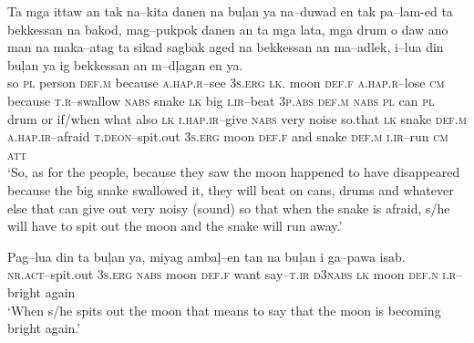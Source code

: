 \ea
\gll Ta  mga  ittaw  an  tak  na--kita  danen  na  bu\c{l}an   ya  na--duwad en  tak  pa--lam-ed  ta  bekkessan   na  bakod,  mag--pukpok  danen  an  ta  mga  lata,  mga  drum   o  daw  ano\footnotemark{}  man  na  maka--atag  ta  sikad  sagbak   aged  na  bekkessan  an  ma--adlek,  i--lua  din  bu\c{l}an   ya  ig\footnotemark{}  bekkessan  an  m--d\c{l}agan  en  ya.\footnotemark{} \\
so  \textsc{pl}  person  \textsc{def.m}  because  \textsc{a.hap.r}--see  3\textsc{s.erg}  \textsc{lk}.  moon
\textsc{def.f}  \textsc{a.hap.r}--lose  \textsc{cm}  because  \textsc{t.r}--swallow  \textsc{nabs}  snake
\textsc{lk}  big  \textsc{i.ir}--beat  3\textsc{p.abs}  \textsc{def.m}  \textsc{nabs}  \textsc{pl}  can  \textsc{pl}  drum
or  if/when  what  also  \textsc{lk}  \textsc{i.hap.ir}--give  \textsc{nabs}  very  noise
so.that  \textsc{lk}  snake  \textsc{def.m}  \textsc{a.hap.ir}--afraid  \textsc{t.deon}--spit.out  3\textsc{s.erg}  moon
\textsc{def.f}  and  snake  \textsc{def.m}  \textsc{i.ir}--run  \textsc{cm}  \textsc{att} \\
\glt ‘So, as for the people, because they saw the moon happened to have disappeared because the big snake swallowed it, they will beat on cans, drums and whatever else that can give out very noisy (sound) so that when the snake is afraid, s/he will have to spit out the moon and the snake will run away.’
\z

\ea
\gll Pag--lua  din  ta  bu\c{l}an  ya,  miyag  amba\c{l}--en   tan  na  bu\c{l}an  i  ga--pawa  isab. \\
\textsc{nr.act}--spit.out  3\textsc{s.erg}  \textsc{nabs}  moon  \textsc{def.f}  want  say--\textsc{t.ir}
\textsc{d3nabs}   \textsc{lk}  moon  \textsc{def.n}  \textsc{i.r}--bright  again \\
\glt ‘When s/he spits out the moon that means to say that the moon is becoming bright again.’  
\z

